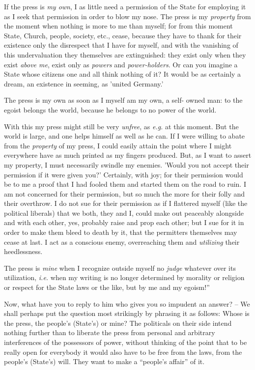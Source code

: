 If the press is \textit{my own}, I as little need a permission of the State 
for employing it as I seek that permission in order to blow my nose. The press 
is my \textit{property} from the moment when nothing is more to me than 
myself; for from this moment State, Church, people, society, etc., cease, 
because they have to thank for their existence only the disrespect that I have 
for myself, and with the vanishing of this undervaluation they themselves are 
extinguished: they exist only when they exist \textit{above me}, exist only as 
\textit{powers} and \textit{power-holders}. Or can you imagine a State whose 
citizens one and all think nothing of it? It would be as certainly a dream, an 
existence in seeming, as 'united Germany.'

The press is my own as soon as I myself am my own, a self- owned man: to the 
egoist belongs the world, because he belongs to no power of the world.

With this my press might still be very \textit{unfree}, as \textit{e.g.} at 
this moment. But the world is large, and one helps himself as well as he can. 
If I were willing to abate from the \textit{property} of my press, I could 
easily attain the point where I might everywhere have as much printed as my 
fingers produced. But, as I want to assert my property, I must necessarily 
swindle my enemies. 'Would you not accept their permission if it were given 
you?' Certainly, with joy; for their permission would be to me a proof that I 
had fooled them and started them on the road to ruin. I am not concerned for 
their permission, but so much the more for their folly and their overthrow. I 
do not sue for their permission as if I flattered myself (like the political 
liberals) that we both, they and I, could make out peaceably alongside and 
with each other, yes, probably raise and prop each other; but I sue for it in 
order to make them bleed to death by it, that the permitters themselves may 
cease at last. I act as a conscious enemy, overreaching them and 
\textit{utilizing} their heedlessness.

The press is \textit{mine} when I recognize outside myself no \textit{judge} 
whatever over its utilization, \textit{i.e.} when my writing is no longer 
determined by morality or religion or respect for the State laws or the like, 
but by me and my egoism!''

Now, what have you to reply to him who gives you so impudent an answer? -- We 
shall perhaps put the question most strikingly by phrasing it as follows: 
Whose is the press, the people's (State's) or mine? The politicals on their 
side intend nothing further than to liberate the press from personal and 
arbitrary interferences of the possessors of power, without thinking of the 
point that to be really open for everybody it would also have to be free from 
the laws, from the people's (State's) will. They want to make a ``people's 
affair'' of it.


